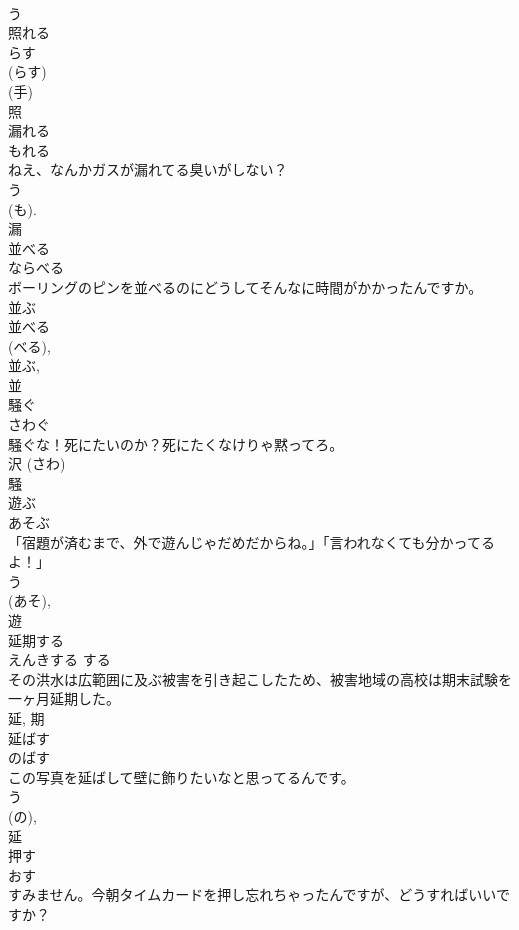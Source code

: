 \documentclass[8pt]{extreport}
\begin{document}
\begin{CJK}{UTF8}{min}
\\	う 
\\	照れる 
\\	らす 
\\	(らす) 
\\	(手) 
\\	照	
\\	漏れる	
\\	もれる	
\\	ねえ、なんかガスが漏れてる臭いがしない？	
\\	う 
\\	(も). 
\\	漏	
\\	並べる	
\\	ならべる	
\\	ボーリングのピンを並べるのにどうしてそんなに時間がかかったんですか。	
\\	並ぶ 
\\	並べる 
\\	(べる), 
\\	並ぶ, 
\\	並	
\\	騒ぐ	
\\	さわぐ	
\\	騒ぐな！死にたいのか？死にたくなけりゃ黙ってろ。	
\\	沢 (さわ) 
\\	騒	
\\	遊ぶ	
\\	あそぶ	
\\	「宿題が済むまで、外で遊んじゃだめだからね。」「言われなくても分かってるよ！」	
\\	う 
\\	(あそ), 
\\	遊	
\\	延期する	
\\	えんきする	する 
\\	その洪水は広範囲に及ぶ被害を引き起こしたため、被害地域の高校は期末試験を一ヶ月延期した。	
\\	延, 期	
\\	延ばす	
\\	のばす	
\\	この写真を延ばして壁に飾りたいなと思ってるんです。	
\\	う 
\\	(の), 
\\	延	
\\	押す	
\\	おす	
\\	すみません。今朝タイムカードを押し忘れちゃったんですが、どうすればいいですか？	

\end{CJK}
\end{document}
